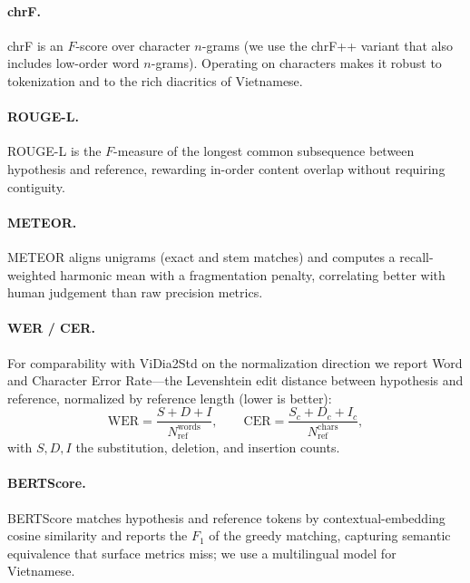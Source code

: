\documentclass[11pt]{article}
\begin{document}
\paragraph{chrF.}
chrF \citep{popovic2015chrf} is an $F$-score over character $n$-grams (we use the
chrF++ variant that also includes low-order word $n$-grams). Operating on
characters makes it robust to tokenization and to the rich diacritics of
Vietnamese.

\paragraph{ROUGE-L.}
ROUGE-L \citep{lin2004rouge} is the $F$-measure of the longest common subsequence
between hypothesis and reference, rewarding in-order content overlap without
requiring contiguity.

\paragraph{METEOR.}
METEOR \citep{banerjee2005meteor} aligns unigrams (exact and stem matches) and
computes a recall-weighted harmonic mean with a fragmentation penalty,
correlating better with human judgement than raw precision metrics.

\paragraph{WER / CER.}
For comparability with ViDia2Std \citep{ta2026vidia2std} on the normalization
direction we report Word and Character Error Rate---the Levenshtein edit distance
between hypothesis and reference, normalized by reference length (lower is better):
\begin{equation}
  \mathrm{WER} = \frac{S + D + I}{N_{\mathrm{ref}}^{\mathrm{words}}},
  \qquad
  \mathrm{CER} = \frac{S_c + D_c + I_c}{N_{\mathrm{ref}}^{\mathrm{chars}}},
\end{equation}
with $S,D,I$ the substitution, deletion, and insertion counts.

\paragraph{BERTScore.}
BERTScore \citep{zhang2020bertscore} matches hypothesis and reference tokens by
contextual-embedding cosine similarity and reports the $F_1$ of the greedy
matching, capturing semantic equivalence that surface metrics miss; we use a
multilingual model for Vietnamese.
\end{document}
